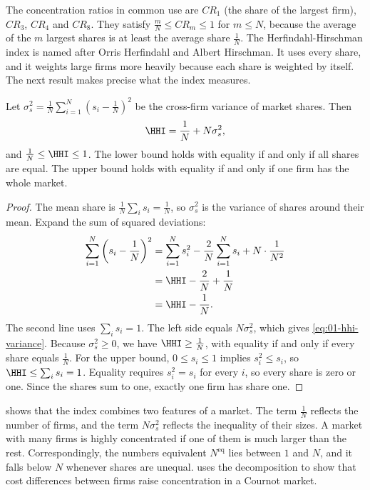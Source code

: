 The concentration ratios in common use are $\mathit{CR}_1$ (the share of the largest firm), $\mathit{CR}_3$,
$\mathit{CR}_4$ and $\mathit{CR}_8$. They satisfy $\frac{m}{N} \le \mathit{CR}_m \le 1$ for $m \le N$, because
the average of the $m$ largest shares is at least the average share $\frac{1}{N}$. The Herfindahl-Hirschman index is
named after Orris Herfindahl and Albert Hirschman. It uses every share, and it weights large firms more heavily
because each share is weighted by itself. The next result makes precise what the index measures.

\begin{lemma}\label{prop:01-hhi-variance}
Let $\sigma_s^2 = \frac{1}{N}\sum_{i=1}^{N} \left(s_i - \frac{1}{N}\right)^2$ be the cross-firm variance of
market shares. Then
\begin{equation}\label{eq:01-hhi-variance}
  \HHI = \frac{1}{N} + N\sigma_s^2 ,
\end{equation}
and $\frac{1}{N} \le \HHI \le 1$. The lower bound holds with equality if and only if all shares are equal. The
upper bound holds with equality if and only if one firm has the whole market.
\end{lemma}

\begin{proof}
The mean share is $\frac{1}{N}\sum_{i} s_i = \frac{1}{N}$, so $\sigma_s^2$ is the variance of shares around
their mean. Expand the sum of squared deviations:
\begin{align*}
  \sum_{i=1}^{N} \left(s_i - \frac{1}{N}\right)^2
  &= \sum_{i=1}^{N} s_i^2 - \frac{2}{N}\sum_{i=1}^{N} s_i + N \cdot \frac{1}{N^2} \\
  &= \HHI - \frac{2}{N} + \frac{1}{N} \\
  &= \HHI - \frac{1}{N}.
\end{align*}
The second line uses $\sum_i s_i = 1$. The left side equals $N\sigma_s^2$, which gives
\eqref{eq:01-hhi-variance}. Because $\sigma_s^2 \ge 0$, we have $\HHI \ge \frac{1}{N}$, with equality if and
only if every share equals $\frac{1}{N}$. For the upper bound, $0 \le s_i \le 1$ implies $s_i^2 \le s_i$, so
$\HHI \le \sum_i s_i = 1$. Equality requires $s_i^2 = s_i$ for every $i$, so every share is zero or one. Since
the shares sum to one, exactly one firm has share one.
\end{proof}

 shows that the index combines two features of a market. The term $\frac{1}{N}$
reflects the number of firms, and the term $N\sigma_s^2$ reflects the inequality of their sizes. A market with
many firms is highly concentrated if one of them is much larger than the rest. Correspondingly, the numbers
equivalent $N^{\mathrm{eq}}$ lies between $1$ and $N$, and it falls below $N$ whenever shares are unequal.
 uses the decomposition to show that cost differences between firms raise concentration
in a Cournot market.


